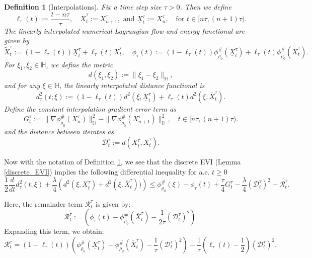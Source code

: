 \documentclass[11pt,a4paper]{amsart}
\newcommand{\1}{\mathds{1}}
\newtheorem{definition}[theorem]{\textbf{Definition}}
\numberwithin{equation}{section}
\begin{document}
\begin{definition}[Interpolations] \label{interpolations_usual}
Fix a time step size $\tau > 0$. Then we define
\[
\ell_{\tau}(t) := \frac{t - n\tau}{\tau}, \quad
\overline{X}^{\tau}_t := X^{\tau}_{n+1},  \text{ and }
\underline{X}^{\tau}_t := X^{\tau}_n, \quad \text{for } t \in [n\tau,(n+1)\tau).
\]
The linearly interpolated numerical Lagrangian flow and energy functional are given by
\[
\tilde{X}^{\tau}_t := (1 - \ell_{\tau}(t)) \underline{X}^{\tau}_t + \ell_{\tau}(t) \overline{X}^{\tau}_t, \quad
\phi_{\tau}(t) := (1 - \ell_{\tau}(t)) \phi^{\#}_{\rho_0}(\underline{X}^{\tau}_t) 
+ \ell_{\tau}(t) \phi^{\#}_{\rho_0}(\overline{X}^{\tau}_t).
\]
For $\xi_1,\xi_2 \in \mathbb{H}$, we define the metric
\[
d(\xi_1, \xi_2) := \|\xi_1 - \xi_2\|_{\mathbb{H}},
\]
and for any $\xi \in \mathbb{H}$, the linearly interpolated distance functional is
\[
d^2_{\tau}(t;\xi) := 
(1 - \ell_{\tau}(t)) d^2(\xi, \underline{X}^{\tau}_t) 
+ \ell_{\tau}(t) d^2(\xi, \overline{X}^{\tau}_t).
\] 
Define the constant interpolation gradient error term as
\[
G^{\tau}_t := \|\nabla \phi^{\#}_{\rho_0}(X^{\tau}_n)\|^2_{\mathbb{H}} - \|\nabla \phi^{\#}_{\rho_0}(X^{\tau}_{n+1})\|^2_{\mathbb{H}}, \quad t \in [n\tau,(n+1)\tau).
\] and the distance between iterates as
\[
\mathcal{D}_{t}^{\tau} := d(\underline{X}^{\tau}_t,\overline{X}^{\tau}_t).
\]
\end{definition}

Now with the notation of Definition \ref{interpolations_usual}, we see that the discrete EVI (Lemma \ref{discrete_EVI}) implies the following differential inequality for a.e. $t \geq 0$
\begin{equation} 
\frac{1}{2} \frac{d}{dt} d^2_{\tau}(t;\xi) + \frac{\lambda}{4} \left( d^2(\xi,\underline{X}^{\tau}_t ) + d^2(\xi,\overline{X}^{\tau}_t) ) \right) 
\leq \phi^{\#}_{\rho_0}(\xi) - \phi_{\tau}(t) +  \frac{\tau}{4} G^{\tau}_t - \frac{\lambda}{4} (\mathcal{D}_{t}^{\tau})^2 + \mathcal{R}_t^{\tau}. 
\label{EVI_Interpolated_Inequality}
\end{equation} 

\noindent Here, the remainder term $\mathcal{R}_t^{\tau}$ is given by:
\[
\mathcal{R}_t^{\tau} := \left( \phi_{\tau}(t) - \phi^{\#}_{\rho_0}(\overline{X}^{\tau}_t) - \frac{1}{2 \tau} (\mathcal{D}_{t}^{\tau})^2 \right).
\]
Expanding this term, we obtain:
\begin{equation}
\mathcal{R}_t^{\tau} = (1-\ell_{\tau}(t)) \left( \phi^{\#}_{\rho_0}(\underline{X}^{\tau}_t) - \phi^{\#}_{\rho_0}(\overline{X}^{\tau}_t) - \frac{1}{\tau} (\mathcal{D}_{t}^{\tau})^2 \right) 
- \frac{1}{\tau}\left( \ell_{\tau}(t)- \frac{1}{2} \right) (\mathcal{D}_{t}^{\tau})^2. \label{remainder_term}
\end{equation}
\end{document}
